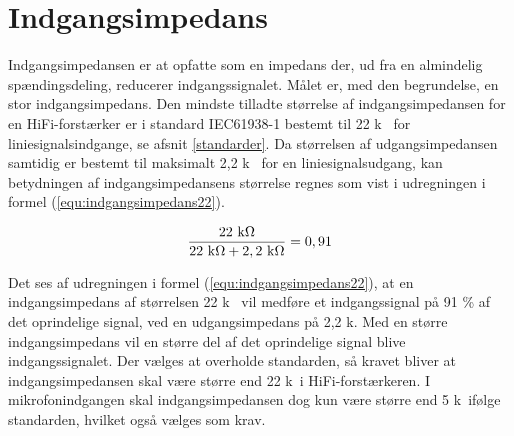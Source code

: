 \section{Indgangsimpedans}
\label{valg_indgangsimpedans}
Indgangsimpedansen er at opfatte som en impedans der, ud fra en almindelig spændingsdeling, reducerer indgangssignalet. Målet er, med den begrundelse, en stor indgangsimpedans. Den mindste tilladte størrelse af indgangsimpedansen for en HiFi-forstærker er i standard IEC61938-1 bestemt til 22 k\ohm~ for liniesignalsindgange, se afsnit \ref{standarder}. Da størrelsen af udgangsimpedansen samtidig er bestemt til maksimalt 2,2 k\ohm~ for en liniesignalsudgang, kan betydningen af indgangsimpedansens størrelse regnes som vist i udregningen i formel (\ref{equ:indgangsimpedans22}). 

\begin{equation}
\label{equ:indgangsimpedans22}
\mathrm{\frac{22~k\ohm}{22~k\ohm + 2,2~k\ohm} = 0,91}
\end{equation}

Det ses af udregningen i formel (\ref{equ:indgangsimpedans22}), at en indgangsimpedans af størrelsen 22 k\ohm~ vil medføre et indgangssignal på 91 \% af det oprindelige signal, ved en udgangsimpedans på 2,2 k\ohm. Med en større indgangsimpedans vil en større del af det oprindelige signal blive indgangssignalet. Der vælges at overholde standarden, så kravet bliver at indgangsimpedansen skal være større end 22 k\ohm~i HiFi-forstærkeren. I mikrofonindgangen skal indgangsimpedansen dog kun være større end 5 k\ohm~ifølge standarden, hvilket også vælges som krav.
